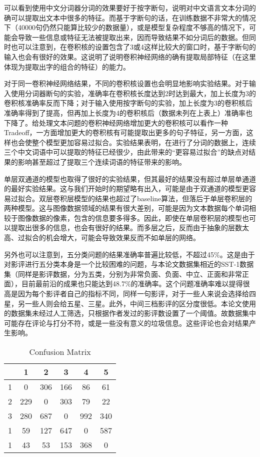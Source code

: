 可以看到使用中文分词器分词的效果要好于按字断句，说明对中文语言文本分词的确可以提取出文本中很多的特征。而基于字断句的话，在训练数据不非常大的情况下（40000句仍然只能算比较少的数据量），或是模型复杂程度不够高的情况下，可能会导致一些信息或特征无法被提取出来，因而导致结果不如分词后的数据。但同时也可以注意到，在卷积核的设置包含了3或4这样比较大的窗口时，基于字断句的输入也会有很好的效果。这说明了说明卷积神经网络的确有提取局部特征（在这里体现为提取出字的组合的特征）的能力。

对于同一卷积神经网络结果，不同的卷积核设置也会明显地影响实验结果。对于输入使用分词器断句的实验，准确率在卷积核长度达到2时达到最大，加上长度为3的卷积核准确率反而下降；对于输入使用按字断句的实验，加上长度为3的卷积核后准确率得到了提高，但再加上长度为4的卷积核后（数据未列在上表上）准确率也下降了。给处理文本问题的卷积神经网络增加更大的卷积核可以看作一种Tradeoff，一方面增加更大的卷积核有可能提取出更多的句子特征，另一方面，这样也会使整个模型更加容易过拟合。实验结果表明，在进行了分词的数据上，连续三个中文词语中可以提取的特征已经很少，由此带来的“更容易过拟合”的缺点对结果的影响甚至超过了提取三个连续词语的特征带来的影响。

单层双通道的模型也取得了很好的实验结果，但其最好的结果没有超过单层单通道的最好实验结果。这与我们开始时的期望略有出入，可能是由于双通道的模型更容易过拟合。双层卷积层模型的结果也超过了baseline算法，但落后于单层卷积层的两种模型。这与图像数据领域的结果有很大差别，可能是因为文本数据每个单词相较于图像数据的像素，包含的信息要多得多。因此，即使在单层卷积层的模型也可以提取出很多的信息，也会有很好的结果。而多层之后，反而由于抽象的层数太高、过拟合的机会增大，可能会导致效果反而不如单层的网络。

另外也可以注意到，五分类问题的结果准确率普遍比较低，不超过45\%。这是由于对影评进行五分类本身是一个比较困难的问题，与本论文数据集相近的SST-1数据集（同样是影评数据，分为五类，分别为非常负面、负面、中立、正面和非常正面），目前最前沿的成果也只能达到48.7\%的准确率。这个问题准确率难以提得很高是因为每个影评者自己的指标不同，同样一句影评，对于一些人来说会选择给四星，另一些人则会给五星、三星。此外，中间三档影评的区分度很低。本论文使用的数据集未经过人工筛选，只根据作者发过的影评数设置了一个阈值。故数据集中可能存在评论与打分不符，或是一些没有意义的垃圾信息。这些评论也会对结果产生影响。

\begin{table}
\centering
\caption{Confusion Matrix} \label{tab:confusion}
\begin{tabular}{c|c|c|c|c|c}
    \hline
     & 1 & 2 & 3 & 4 & 5\\
    \hline
    1 & 0 & 306 & 166 & 86 & 61\\
    \hline
    2 & 229 & 0 & 303 & 79 & 22 \\
    \hline
    3 & 280 & 687 & 0 & 992 & 340 \\
    \hline
    1 & 59 & 127 & 647 & 0 & 587\\
    \hline
    1 & 43 & 53 & 153 & 368 & 0\\
    \hline
\end{tabular}
\end{table}

